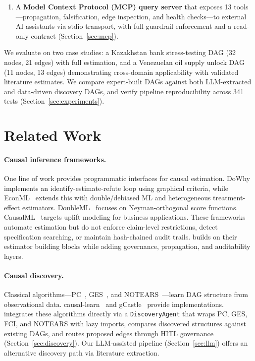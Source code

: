 \documentclass{article}
\begin{document}
\begin{enumerate}[leftmargin=*, itemsep=2pt]
    \item A \textbf{Model Context Protocol (MCP) query server} that exposes 13 tools---propagation, falsification, edge inspection, and health checks---to external AI assistants via stdio transport, with full guardrail enforcement and a read-only contract (Section~\ref{sec:mcp}).
\end{enumerate}

We evaluate \oc{} on two case studies: a Kazakhstan bank stress-testing DAG (32 nodes, 21 edges) with full estimation, and a Venezuelan oil supply unlock DAG (11 nodes, 13 edges) demonstrating cross-domain applicability with validated literature estimates. We compare expert-built DAGs against both LLM-extracted and data-driven discovery DAGs, and verify pipeline reproducibility across 341 tests (Section~\ref{sec:experiments}).

\section{Related Work}
\label{sec:related}

\paragraph{Causal inference frameworks.}
One line of work provides programmatic interfaces for causal estimation. DoWhy~\citep{sharma2020dowhy} implements an identify-estimate-refute loop using graphical criteria, while EconML~\citep{battocchi2019econml} extends this with double/debiased ML and heterogeneous treatment-effect estimators. DoubleML~\citep{bach2022doubleml} focuses on Neyman-orthogonal score functions. CausalML~\citep{chen2020causalml} targets uplift modeling for business applications. These frameworks automate estimation but do not enforce claim-level restrictions, detect specification searching, or maintain hash-chained audit trails. \oc{} builds on their estimator building blocks while adding governance, propagation, and auditability layers.

\paragraph{Causal discovery.}
Classical algorithms---PC~\citep{spirtes2000causation}, GES~\citep{chickering2002optimal}, and NOTEARS~\citep{zheng2018dags}---learn DAG structure from observational data. causal-learn~\citep{zheng2024causallearn} and gCastle~\citep{zhang2021gcastle} provide implementations. \oc{} integrates these algorithms directly via a \texttt{DiscoveryAgent} that wraps PC, GES, FCI, and NOTEARS with lazy imports, compares discovered structures against existing DAGs, and routes proposed edges through HITL governance (Section~\ref{sec:discovery}). Our LLM-assisted pipeline (Section~\ref{sec:llm}) offers an alternative discovery path via literature extraction.
\end{document}
